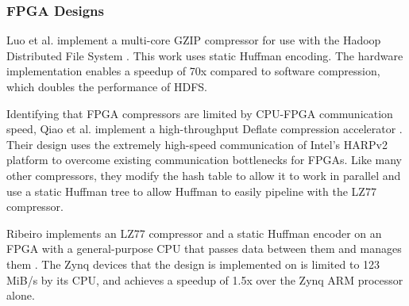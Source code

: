 \documentclass[doublespace,draft,nopageskip]{VTthesis} %
\begin{document}
\subsubsection{FPGA Designs}\label{sss:fpga_designs}
Luo et al. implement a multi-core GZIP compressor for use with the Hadoop Distributed File System \cite{hdfsgzip}. This work uses static Huffman encoding. The hardware implementation enables a speedup of 70x compared to software compression, which doubles the performance of HDFS.

Identifying that FPGA compressors are limited by CPU-FPGA communication speed, Qiao et al. implement a high-throughput Deflate compression accelerator \cite{fpgadeflate}. Their design uses the extremely high-speed communication of Intel's HARPv2 platform to overcome existing communication bottlenecks for FPGAs. Like many other compressors, they modify the hash table to allow it to work in parallel and use a static Huffman tree to allow Huffman to easily pipeline with the LZ77 compressor.

Ribeiro implements an LZ77 compressor and a static Huffman encoder on an FPGA with a general-purpose CPU that passes data between them and manages them \cite{ribeiro}. The Zynq devices that the design is implemented on is limited to 123 MiB/s by its CPU, and achieves a speedup of 1.5x over the Zynq ARM processor alone.



\end{document}
